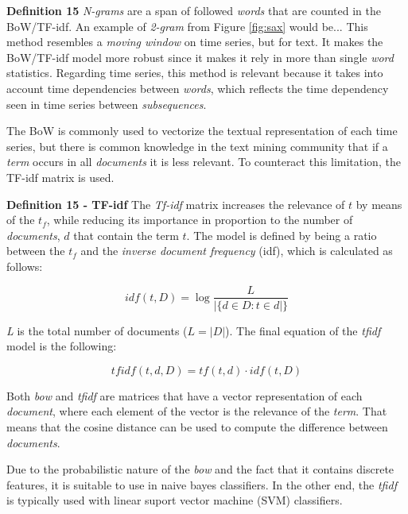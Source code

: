 \item \textbf{Definition 15} \textit{N-grams} are a span of followed \textit{words} that are counted in the BoW/TF-idf. An example of \textit{2-gram} from Figure \ref{fig:sax} would be...
This method resembles a \textit{moving window} on time series, but for text. It makes the BoW/TF-idf model more robust since it makes it rely in more than single \textit{word} statistics. Regarding time series, this method is relevant because it takes into account time dependencies between \textit{words}, which reflects the time dependency seen in time series between \textit{subsequences}.


The BoW is commonly used to vectorize the textual representation of each time series, but there is common knowledge in the text mining community that if a \textit{term} occurs in all \textit{documents} it is less relevant. To counteract this limitation, the TF-idf matrix is used.

\item \textbf{Definition 15 - TF-idf} The \textit{Tf-idf} matrix increases the relevance of $t$ by means of the $t_f$, while reducing its importance in proportion to the number of \textit{documents}, $d$ that contain the term $t$. The model is defined by being a ratio between the $t_f$ and the \textit{inverse document frequency} (idf), which is calculated as follows:

\begin{equation}
    idf(t, D) = \log{\frac{L}{|\{d \in D: t \in d|\}}}
\end{equation}

\textit{L} is the total number of documents ($L = |D|$). The final equation of the \textit{tfidf} model is the following:

\begin{equation}
    tfidf(t, d, D) = tf(t, d) \cdot idf(t, D) 
\end{equation}

Both \textit{bow} and \textit{tfidf} are matrices that have a vector representation of each \textit{document}, where each element of the vector is the relevance of the \textit{term}. That means that the cosine distance can be used to compute the difference between \textit{documents}.
\par
Due to the probabilistic nature of the \textit{bow} and the fact that it contains discrete features, it is suitable to use in naive bayes classifiers. In the other end, the \textit{tfidf} is typically used with linear suport vector machine (SVM) classifiers.

